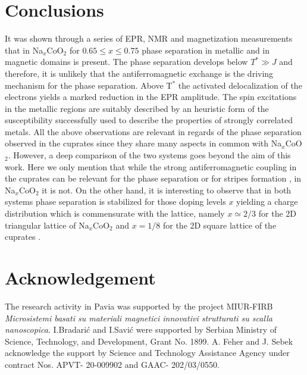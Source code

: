 \documentclass[prb,showpacs,preprintnumbers,amsmath,amssymb,floatfix]{revtex4}
\begin{document}
\section{Conclusions}

It was shown through a series of EPR, NMR and magnetization
measurements that in Na$_x$CoO$_2$ for $0.65\leq x\leq 0.75$ phase
separation in metallic and in magnetic domains is present. The
phase separation develops below $T^*\gg J$ and therefore, it is
unlikely that the antiferromagnetic exchange is the driving
mechanism for the phase separation. Above T$^*$ the activated
delocalization of the electrons yields a marked reduction in the
EPR amplitude. The spin excitations in the metallic regions are
suitably described by an heuristic form of the susceptibility
successfully used to describe the properties of strongly
correlated metals. All the above observations are relevant in
regards of the phase separation observed in the cuprates since
they share many aspects in common with Na$_x$CoO$_2$. However, a
deep comparison of the two systems goes beyond the aim of this
work. Here we only mention that while the strong antiferromagnetic
coupling in the cuprates can be relevant for the phase separation
or for stripes formation \cite{Tranqu}, in Na$_x$CoO$_2$ it is
not. On the other hand, it is interesting to observe that in both
systems phase separation is stabilized for those doping levels $x$
yielding a charge distribution which is commensurate with the
lattice, namely $x\simeq 2/3$ for the 2D triangular lattice of
Na$_x$CoO$_2$ and $x=1/8$ for the 2D square lattice of the
cuprates \cite{Tranqu}.


\section*{Acknowledgement}

The research activity in Pavia was supported by the project
MIUR-FIRB {\it Microsistemi basati su materiali magnetici
innovativi strutturati su scalla nanoscopica}. I.Bradari\'c and
I.Savi\'c were supported by Serbian Ministry of Science,
Technology, and Development, Grant No. 1899. A. Feher and J. Sebek
acknowledge the support by Science and Technology Assistance
Agency under contract  Nos. APVT- 20-009902 and GAAC- 202/03/0550.
\end{document}
